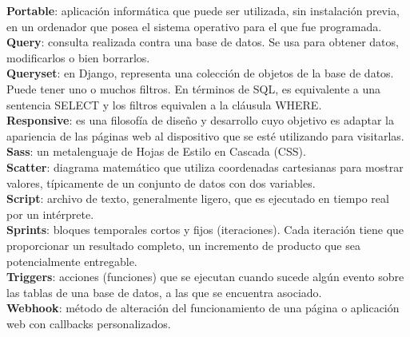\textbf{Portable}: aplicación informática que puede ser utilizada, sin instalación previa, en un ordenador que posea el sistema operativo para el que fue programada.\\

\textbf{Query}:  consulta realizada contra una base de datos. Se usa para obtener datos, modificarlos o bien borrarlos.\\

\textbf{Queryset}: en Django, representa una colección de objetos de la base de datos. Puede tener uno o muchos filtros. En términos de SQL, es equivalente a una sentencia SELECT y los filtros equivalen a la cláusula WHERE.\\

\textbf{Responsive}: es una filosofía de diseño y desarrollo cuyo objetivo es adaptar la apariencia de las páginas web al dispositivo que se esté utilizando para visitarlas.\\

\textbf{Sass}: un metalenguaje de Hojas de Estilo en Cascada (CSS).\\

\textbf{Scatter}: diagrama matemático que utiliza coordenadas cartesianas para mostrar valores, típicamente de un conjunto de datos con dos variables.\\

\textbf{Script}: archivo de texto, generalmente ligero, que es ejecutado en tiempo real por un intérprete.\\

\textbf{Sprints}:  bloques temporales cortos y fijos (iteraciones). Cada iteración tiene que proporcionar un resultado completo, un incremento de producto que sea potencialmente entregable.\\

\textbf{Triggers}: acciones (funciones) que se ejecutan cuando sucede algún evento sobre las tablas de una base de datos, a las que se encuentra asociado.\\

\textbf{Webhook}: método de alteración del funcionamiento de una página o aplicación web con callbacks personalizados.

\clearpage
